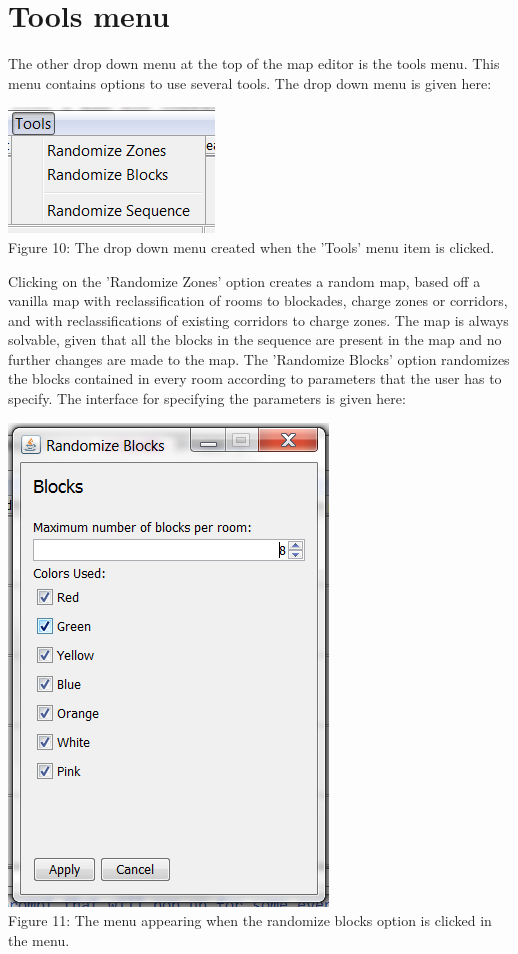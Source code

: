 \documentclass[]{article}
\begin{document}
\section*{Tools menu}
The other drop down menu at the top of the map editor is the tools menu. This menu contains options to use several tools. The drop down menu is given here:
\begin{center}
	\centering
	\includegraphics{DropDownTools.png}\\
	Figure 10: The drop down menu created when the 'Tools' menu item is clicked.
\end{center}
Clicking on the 'Randomize Zones' option creates a random map, based off a vanilla map with reclassification of rooms to blockades, charge zones or corridors, and with reclassifications of existing corridors to charge zones. The map is always solvable, given that all the blocks in the sequence are present in the map and no further changes are made to the map. The 'Randomize Blocks' option randomizes the blocks contained in every room according to parameters that the user has to specify. The interface for specifying the parameters is given here:
\begin{center}
	\centering
	\includegraphics[scale=0.6]{MenuBlocks.png}\\
	Figure 11: The menu appearing when the randomize blocks option is clicked in the menu.
\end{center}
\end{document}
